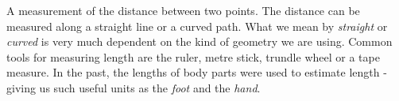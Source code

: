 A measurement of the distance between two points.
The distance can be measured along a straight line or a curved path. 
What we mean by \textit{straight} or \textit{curved} is very much dependent on the kind of geometry we are using.  
Common tools for measuring length are the ruler, metre stick, trundle wheel or a tape measure. In the past, the lengths of body parts were used to estimate length - giving us such useful units as the \textit{foot} and the \textit{hand}.